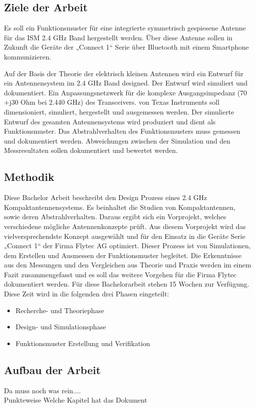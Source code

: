 \subsection{Ziele der Arbeit}
Es soll ein Funktionsmuster für eine integrierte symmetrisch gespiesene Antenne für das ISM 2.4 GHz Band hergestellt werden. Über diese Antenne sollen in Zukunft die Geräte der „Connect 1“ Serie über Bluetooth mit einem Smartphone kommunizieren. 

Auf der Basis der Theorie der elektrisch kleinen Antennen wird ein Entwurf für ein Antennensystem im 2.4 GHz Band designed. Der Entwurf wird simuliert und dokumentiert. 
Ein Anpassungsnetzwerk  für die komplexe Ausgangsimpedanz (70 +j30 Ohm bei 2.440 GHz) des Transceivers. von Texas Instruments soll dimensioniert, simuliert, hergestellt und ausgemessen werden.
Der simulierte Entwurf des gesamten Antennensystems wird produziert und dient als Funktionsmuster. Das Abstrahlverhalten des Funktionsmusters muss gemessen und dokumentiert werden.
Abweichungen zwischen der Simulation und den Messresultaten sollen dokumentiert und bewertet werden.
\subsection{Methodik}
Diese Bachelor Arbeit beschreibt den Design Prozess eines 2.4 GHz Kompaktantennensystems. Es beinhaltet die Studien von Kompaktantennen, sowie deren Abstrahlverhalten. Daraus ergibt sich ein  Vorprojekt, welches verschiedene mögliche Antennenkonzepte prüft. Aus diesem Vorprojekt wird das vielversprechendste Konzept ausgewählt und für den Einsatz in die Geräte Serie „Connect 1“ der Firma Flytec AG optimiert. Dieser Prozess ist von Simulationen, dem  Erstellen und Ausmessen der Funktionsmuster begleitet. Die Erkenntnisse aus den Messungen und den Vergleichen aus Theorie und Praxis werden im einem Fazit zusammengefasst und es soll das weitere Vorgehen für die Firma Flytec dokumentiert werden. Für diese Bachelorarbeit stehen 15 Wochen zur Verfügung. Diese Zeit wird in die folgenden drei Phasen eingeteilt:
\begin{itemize}
	\item Recherche- und Theoriephase
	\item Design- und Simulationsphase 
	\item Funktionsmuster Erstellung und Verifikation
\end{itemize}

\subsection{Aufbau der Arbeit}
Da muss noch was rein....\\
Punkteweise Welche Kapitel hat das Dokument
